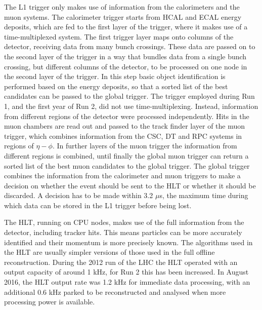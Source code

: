 The \ac{L1} trigger only makes use of information from the calorimeters and the muon systems.
The calorimeter trigger starts from \ac{HCAL} and \ac{ECAL} energy deposits, 
which are fed to the first layer of the trigger, where it makes use of a time-multiplexed system. 
The first trigger layer maps onto columns of the detector, receiving data from many bunch crossings. These data are passed
on to the second layer of the trigger in a way that bundles data from a single bunch crossing, but
different columns of the detector, to be processed on one node in the second layer of the
trigger. In this step basic object identification is performed based on the energy
deposits, so that a sorted list of the best candidates can be passed to the global trigger.
The trigger employed during Run 1, and the first year of Run 2, did not use time-multiplexing. Instead, 
information from different regions of the detector were processed independently.
Hits in the muon chambers are read out and passed to the track finder layer 
of the muon trigger, which combines information from the CSC, \ac{DT}
and RPC systems in regions of $\eta-\phi$.
In further layers of the muon trigger the information from different
regions is combined, until finally the global muon trigger
can return a sorted list of the best muon candidates to the global trigger.
The global trigger combines the information from the calorimeter and muon triggers
to make a decision on whether the event should be sent to the \ac{HLT} or whether
it should be discarded. A decision has to be made within 3.2 $\mu$s, the maximum time during
which data can be stored in the \ac{L1} trigger before being lost.


The \ac{HLT}, running on CPU nodes, makes use of the full information
from the detector, including tracker hits. This means particles
can be more accurately identified and their momentum is more
precisely known. The algorithms used in the \ac{HLT} are usually simpler
versions of those used in the full offline reconstruction. %
During the 2012 run of the \ac{LHC} the \ac{HLT} operated with an output
capacity of around 1 kHz, for Run 2 this has been increased. In August 2016, 
the \ac{HLT} output rate was 1.2 kHz for immediate data processing, with
an additional 0.6 kHz parked to be reconstructed and analysed when 
more processing power is available\cite{CMS-PAS-HIG-16-037}. %

